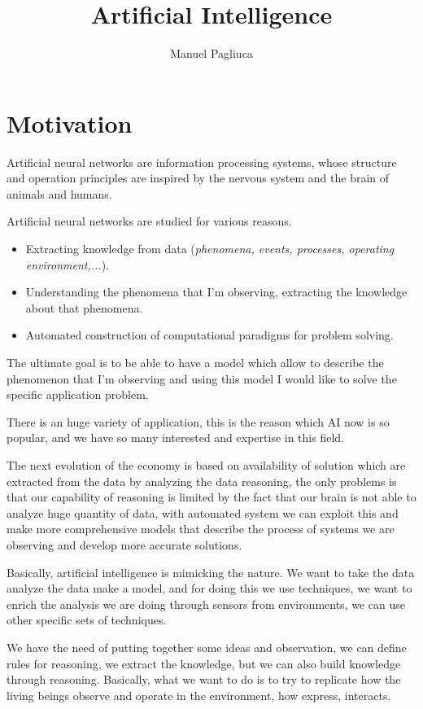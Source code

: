 \documentclass{article}
\title{\textbf{Artificial Intelligence}}
\author{Manuel Pagliuca}
\begin{document}
\maketitle
\tableofcontents
\newpage
\pagebreak
\section{Motivation}
Artificial neural networks are information processing systems, whose structure and
operation principles are inspired by the nervous system and the brain of animals and
humans.

Artificial neural networks are studied for various reasons.

\begin{itemize}
    \item Extracting knowledge from data (\textit{phenomena, events, processes, operating environment,...}).
    \item Understanding the phenomena that I’m observing, extracting the knowledge about that phenomena.
    \item Automated construction of computational paradigms for problem solving.
\end{itemize}

The ultimate goal is to be able to have a model which allow to describe the phenomenon
that I’m observing and using this model I would like to solve the specific application problem.

There is an huge variety of application, this is the reason which AI now is so popular, and we
have so many interested and expertise in this field.

The next evolution of the economy is based on availability of solution which are extracted
from the data by analyzing the data reasoning, the only problems is that our capability
of reasoning is limited by the fact that our brain is not able to analyze huge quantity
of data, with automated system we can exploit this and make more comprehensive models that describe
the process of systems we are observing and develop more accurate solutions.

Basically, artificial intelligence is mimicking the nature. We want to take the data
analyze the data make a model, and for doing this we use techniques, we want to enrich
the analysis we are doing through sensors from environments, we can use other
specific sets of techniques.

We have the need of putting together some ideas and observation, we can define rules for reasoning, we extract the knowledge,
but we can also build knowledge through reasoning. Basically, what we want to do is to try to replicate
how the living beings observe and operate in the environment, how express, interacts.
\end{document}
